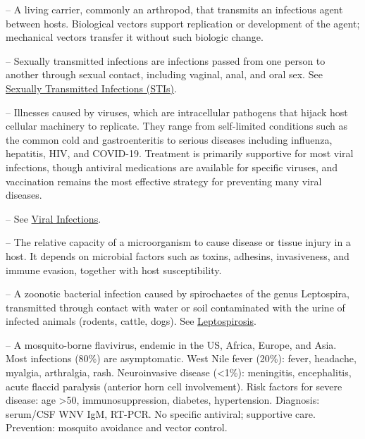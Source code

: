 -- A living carrier, commonly an arthropod, that transmits an infectious agent between hosts. Biological vectors support replication or development of the agent; mechanical vectors transfer it without such biologic change.

-- Sexually transmitted infections are infections passed from one person to another through sexual contact, including vaginal, anal, and oral sex. See \hyperlink{Sexually Transmitted Infections (STIs)}{Sexually Transmitted Infections (STIs)}.

-- Illnesses caused by viruses, which are intracellular pathogens that hijack host cellular machinery to replicate. They range from self-limited conditions such as the common cold and gastroenteritis to serious diseases including influenza, hepatitis, HIV, and COVID-19. Treatment is primarily supportive for most viral infections, though antiviral medications are available for specific viruses, and vaccination remains the most effective strategy for preventing many viral diseases.

-- See \hyperlink{Viral Infections}{Viral Infections}.

-- The relative capacity of a microorganism to cause disease or tissue injury in a host. It depends on microbial factors such as toxins, adhesins, invasiveness, and immune evasion, together with host susceptibility.

-- A zoonotic bacterial infection caused by spirochaetes of the genus Leptospira, transmitted through contact with water or soil contaminated with the urine of infected animals (rodents, cattle, dogs). See \hyperlink{Leptospirosis}{Leptospirosis}.

-- A mosquito-borne flavivirus, endemic in the US, Africa, Europe, and Asia. Most infections (80\%) are asymptomatic. West Nile fever (20\%): fever, headache, myalgia, arthralgia, rash. Neuroinvasive disease (<1\%): meningitis, encephalitis, acute flaccid paralysis (anterior horn cell involvement). Risk factors for severe disease: age >50, immunosuppression, diabetes, hypertension. Diagnosis: serum/CSF WNV IgM, RT-PCR. No specific antiviral; supportive care. Prevention: mosquito avoidance and vector control.


